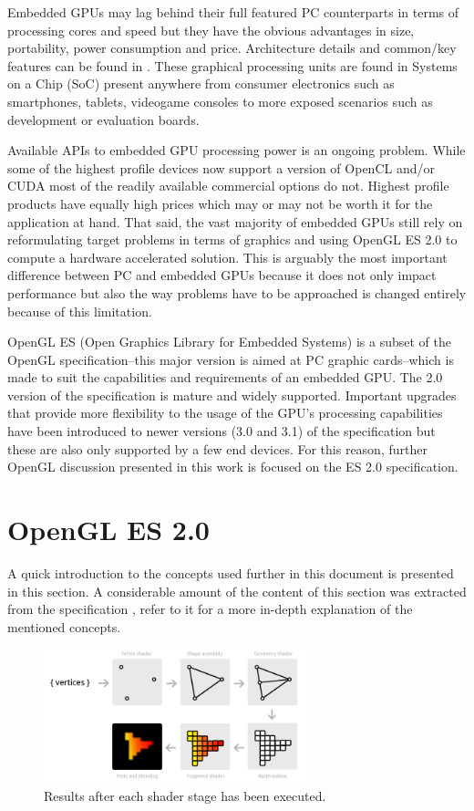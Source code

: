 \documentclass[conference]{IEEEtran}
\begin{document}
Embedded GPUs may lag behind their full featured PC counterparts in terms of processing cores and speed but they have the obvious advantages in size, portability, power consumption and price. Architecture details and common/key features can be found in \cite{singhal12}. These graphical processing units are found in Systems on a Chip (SoC) present anywhere from consumer electronics such as smartphones, tablets, videogame consoles to more exposed scenarios such as development or evaluation boards.

Available APIs to embedded GPU processing power is an ongoing problem. While some of the highest profile devices now support a version of OpenCL and/or CUDA most of the readily available commercial options do not. Highest profile products have equally high prices which may or may not be worth it for the application at hand. That said, the vast majority of embedded GPUs still rely on reformulating target problems in terms of graphics and using OpenGL ES 2.0 to compute a hardware accelerated solution. This is arguably the most important difference between PC and embedded GPUs because it does not only impact performance but also the way problems have to be approached is changed entirely because of this limitation.

OpenGL ES (Open Graphics Library for Embedded Systems) is a subset of the OpenGL specification--this major version is aimed at PC graphic cards--which is made to suit the capabilities and requirements of an embedded GPU. The 2.0 version of the specification is mature and widely supported. Important upgrades that provide more flexibility to the usage of the GPU's processing capabilities have been introduced to newer versions (3.0 and 3.1) of the specification but these are also only supported by a few end devices. For this reason, further OpenGL discussion presented in this work is focused on the ES 2.0 specification.


\section{OpenGL ES 2.0}
A quick introduction to the concepts used further in this document is presented in this section. A considerable amount of the content of this section was extracted from the specification \cite{opengles2}, refer to it for a more in-depth explanation of the mentioned concepts.

\begin{figure}[!t]
	\centering
	\includegraphics[width=3.0in]{shader_work}
	\caption{Results after each shader stage has been executed.}
	\label{fig:shader_work}
\end{figure}
\end{document}

